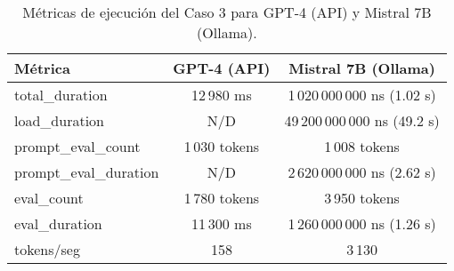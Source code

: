 
\begin{table}[h!]
\centering
\begin{tabular}{|l|c|c|}
\hline
\textbf{Métrica} & \textbf{GPT-4 (API)} & \textbf{Mistral 7B (Ollama)} \\
\hline
total\_duration & 12\,980 ms & 1\,020\,000\,000 ns (1.02 s) \\
load\_duration & N/D & 49\,200\,000\,000 ns (49.2 s) \\
prompt\_eval\_count & 1\,030 tokens & 1\,008 tokens \\
prompt\_eval\_duration & N/D & 2\,620\,000\,000 ns (2.62 s) \\
eval\_count & 1\,780 tokens & 3\,950 tokens \\
eval\_duration & 11\,300 ms & 1\,260\,000\,000 ns (1.26 s) \\
tokens/seg & 158 & 3\,130 \\
\hline
\end{tabular}
\caption{Métricas de ejecución del Caso 3 para GPT-4 (API) y Mistral 7B (Ollama).}
\end{table}
